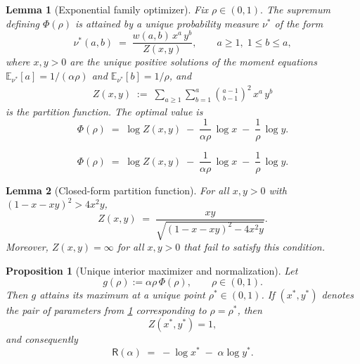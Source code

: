 \documentclass[10pt,a4paper]{amsart}
\newtheorem{lemma}{Lemma}
\newtheorem{proposition}{Proposition}
\newcommand{\E}{\mathbb{E}}
\begin{document}
\begin{lemma}[Exponential family optimizer]\label{lem:inner-optimizer}
Fix $\rho\in(0,1).$ The supremum defining $\Phi(\rho)$ is attained by a unique probability measure $\nu^*$ of the form
\begin{equation}\label{eq:inner-optimizer-form}
    \nu^*(a,b)\;=\;\frac{w(a,b)\,x^a\,y^b}{Z(x,y)},\qquad a\ge 1,\;1\le b\le a,
\end{equation}
where $x,y>0$ are the unique positive solutions of the moment equations $\E_{\nu^*}[a]=1/(\alpha\rho)$ and $\E_{\nu^*}[b]=1/\rho$, and
\begin{align*}
    Z(x,y)\;:=\;\sum_{a\ge 1}\sum_{b=1}^{a}\binom{a-1}{b-1}^{2}\,x^{a}\,y^{b}
\end{align*}
is the partition function. The optimal value is
\begin{equation}\label{eq:Phi-from-Z}
    \Phi(\rho)\;=\;\log Z(x,y)\;-\;\frac{1}{\alpha\rho}\,\log x\;-\;\frac{1}{\rho}\,\log y.
\end{equation}
\end{lemma}

\begin{equation}
    \Phi(\rho)\;=\;\log Z(x,y)\;-\;\frac{1}{\alpha\rho}\,\log x\;-\;\frac{1}{\rho}\,\log y.
\end{equation}

\begin{lemma}[Closed-form partition function]\label{lem:partition-closed-form}
    For all $x,y>0$ with $(1-x-xy)^2>4x^2 y$,
    \begin{equation}\label{eq:partition-closed-form}
        Z(x,y)\;=\;\frac{xy}{\sqrt{(1-x-xy)^{2}-4x^{2}y}}.
    \end{equation}
    Moreover, $Z(x,y) = \infty$ for all $x, y > 0$ that fail to satisfy this condition.
\end{lemma}

\begin{proposition}[Unique interior maximizer and normalization]\label{prop:Z-equals-one}
Let
\[
g(\rho):=\alpha\rho\,\Phi(\rho), \qquad \rho\in(0,1).
\]
Then \(g\) attains its maximum at a unique point \(\rho^*\in(0,1)\). If
\((x^*,y^*)\) denotes the pair of parameters from \cref{lem:inner-optimizer}
corresponding to \(\rho=\rho^*\), then
\begin{equation}\label{eq:Z-equals-one}
    Z(x^*,y^*)=1,
\end{equation}
and consequently
\begin{equation}\label{eq:R-explicit}
    \mathsf R(\alpha)\;=\;-\log x^*\;-\;\alpha\log y^*.
\end{equation}
\end{proposition}
\end{document}
